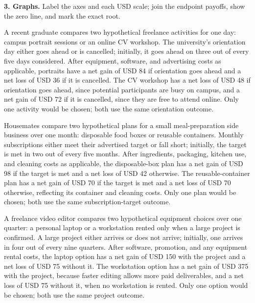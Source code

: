 \textbf{3. Graphs.} Label the axes and each USD scale; join the endpoint payoffs, show the zero line, and mark the exact root.


\vspace{-3mm}
A recent graduate compares two hypothetical freelance activities for one day: campus
portrait sessions or an online CV workshop. The university's orientation day either goes
ahead or is cancelled; initially, it goes ahead on three out of every five days considered.
After equipment, software, and advertising costs as applicable, portraits have a net gain
of USD 84 if orientation goes ahead and a net loss of USD 36 if it is cancelled. The CV
workshop has a net loss of USD 48 if orientation goes ahead, since potential participants
are busy on campus, and a net gain of USD 72 if it is cancelled, since they are free to
attend online. Only one activity would be chosen; both use the same orientation outcome.

Housemates compare two hypothetical plans for a small meal-preparation side business over
one month: disposable food boxes or reusable containers. Monthly subscriptions either
meet their advertised target or fall short; initially, the target is met in two out of
every five months. After ingredients, packaging, kitchen use, and cleaning costs as
applicable, the disposable-box plan has a net gain of USD 98 if the target is met and a
net loss of USD 42 otherwise. The reusable-container plan has a net gain of USD 70 if the
target is met and a net loss of USD 70 otherwise, reflecting its container and cleaning
costs. Only one plan would be chosen; both use the same subscription-target outcome.

A freelance video editor compares two hypothetical equipment choices over one quarter:
a personal laptop or a workstation rented only when a large project is confirmed.
A large project either arrives or does not arrive; initially, one arrives in four out
of every nine quarters. After software, promotion, and any equipment rental costs, the
laptop option has a net gain of USD 150 with the project and a net loss of USD 75 without
it. The workstation option has a net gain of USD 375 with the project, because faster
editing allows more paid deliverables, and a net loss of USD 75 without it, when no
workstation is rented. Only one option would be chosen; both use the same project outcome.


